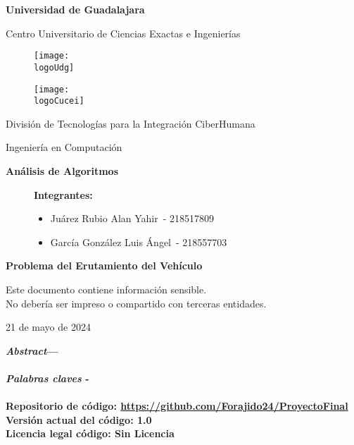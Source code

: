 \documentclass[10pt,twocolumn,letterpaper]{article}
\title{\fontsize{24}{28.8}\selectfont \theTitle}
\date{}
\author{\theAuthor}
\author{\bAuthor}
\affil{\small{\textit{CENTRO UNIVERSITARIO DE CIENCIAS}\\
	\textit{EXACTAS E INGENIERÍAS, (CUCEI, UDG)}}}
\affil{
		\fontfamily{courier}\selectfont
		\theAuthorMail\\
		\fontfamily{courier}\selectfont
		\bAuthorMail
	}
\newcommand{\logoUdg}{logo-udg.jpg}
\newcommand{\logoCucei}{logo-cucei.jpg}
\newcommand{\universidad}{Universidad de Guadalajara}
\newcommand{\cede}{Centro Universitario de Ciencias Exactas e Ingenierías}
\newcommand{\materia}{Análisis de Algoritmos}
\newcommand{\carrera}{Ingeniería en Computación}
\newcommand{\division}{División de Tecnologías para la Integración CiberHumana}
\newcommand{\theTitle}{Problema del Erutamiento del Vehículo}
\newcommand{\startDate}{21 de mayo de 2024}
\newcommand{\theAuthor}{Juárez Rubio Alan Yahir}
\newcommand{\bAuthor}{García González Luis Ángel}
\newcommand{\theAuthorCode}{218517809}
\newcommand{\bAuthorCode}{218557703}
\newcommand{\repositorio}{\url{https://github.com/Forajido24/ProyectoFinal}}
\newcommand{\version}{1.0}
\newcommand{\licencia}{Sin Licencia}
\newcommand{\nl}{\par\vspace{0.4cm}}
\begin{document}

\begin{titlepage}
	\centering
	{\huge\textbf{\universidad}}\par\vspace{0.6cm}
	{\LARGE{\cede}}\vfill
	
	\begin{figure}[h]
		\begin{minipage}[t]{0.45\textwidth}
			\centering
			\texttt{[image: \\logoUdg]}
		\end{minipage}
		\hfill
		\begin{minipage}[t]{0.45\textwidth}
			\centering
			\texttt{[image: \\logoCucei]}
		\end{minipage}
	\end{figure}\vfill
	
	\Large{
		\division\nl
		\carrera\nl
		\textbf{\materia}\nl
	}
	\begin{figure}[h]
		\centering
		\begin{minipage}[t]{0.75\textwidth}
			{\Large
				\textbf{Integrantes:}
				\begin{itemize}
					\item \theAuthor\ - \theAuthorCode
					\item \bAuthor\ - \bAuthorCode
				\end{itemize}
			}
		\end{minipage}
	\end{figure}\vfill
	{\LARGE{\textbf{\theTitle}}}\vfill
	
	\begin{tcolorbox}[colback=red!5!white, colframe=red!75!black]
		\centering
		Este documento contiene información sensible.\\
		No debería ser impreso o compartido con terceras entidades.
	\end{tcolorbox}\vfill

	{\large \startDate}\par
\end{titlepage}

\maketitle

\noindent\textbf{\textit{Abstract}— \\
	\\
	\textit{Palabras claves} - \\
	\\
	Repositorio de código: \repositorio\\
	Versión actual del código: \version\\
	Licencia legal código: \licencia
}
\end{document}
